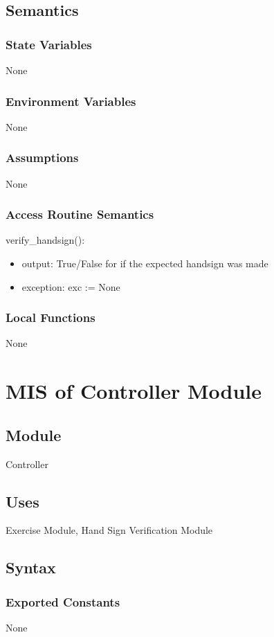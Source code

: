 \documentclass[12pt, titlepage]{article}
\begin{document}
\subsection{Semantics}
\subsubsection{State Variables}
None
\subsubsection{Environment Variables}
None
\subsubsection{Assumptions}
None
\subsubsection{Access Routine Semantics}
\noindent verify\_handsign():
\begin{itemize}
\item output: True/False for if the expected handsign was made 
\item exception: exc := None 
\end{itemize}
 \subsubsection{Local Functions}
None


\newpage

\section{MIS of Controller Module} \label{Module} 
\subsection{Module}
Controller
\subsection{Uses}
Exercise Module, Hand Sign Verification Module
\subsection{Syntax}
 \subsubsection{Exported Constants}
None
\end{document}
